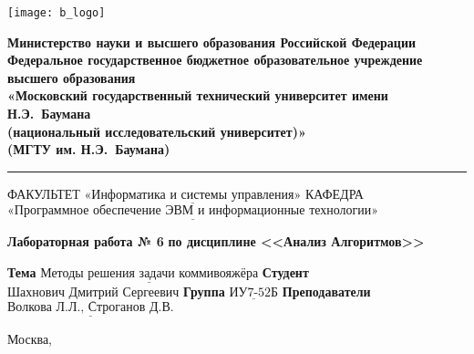 \thispagestyle{empty}

\noindent \begin{minipage}{0.15\textwidth}
	\texttt{[image: b\_logo]}
\end{minipage}
\noindent\begin{minipage}{0.85\textwidth}\centering
	\textbf{Министерство науки и высшего образования Российской Федерации}\\
	\textbf{Федеральное государственное бюджетное образовательное учреждение высшего образования}\\
	\textbf{«Московский государственный технический университет имени Н.Э.~Баумана}\\
	\textbf{(национальный исследовательский университет)»}\\
	\textbf{(МГТУ им. Н.Э.~Баумана)}
\end{minipage}

\noindent\rule{\linewidth}{3pt}
\newline\newline
\noindent ФАКУЛЬТЕТ $\underline{\text{«Информатика и системы управления»}}$ \newline\newline
\noindent КАФЕДРА $\underline{\text{«Программное обеспечение ЭВМ и информационные технологии»}}$

\vspace{1cm}

\begin{minipage}{\textwidth}
	\centering
	\Large\textbf{Лабораторная работа № 6}\newline
	\textbf{по дисциплине <<Анализ Алгоритмов>>}\newline\newline
\end{minipage}

\noindent\textbf{Тема} $\underline{\text{Методы решения задачи коммивояжёра}}$\newline\newline
\noindent\textbf{Студент} $\underline{\text{Шахнович Дмитрий Сергеевич}}$\newline\newline
\noindent\textbf{Группа} $\underline{\text{ИУ7-52Б}}$\newline\newline
\noindent\textbf{Преподаватели} $\underline{\text{Волкова Л.Л., Строганов Д.В.}}$\newline

\begin{center}
	\vfill
	Москва,~\the\year
\end{center}
\clearpage

